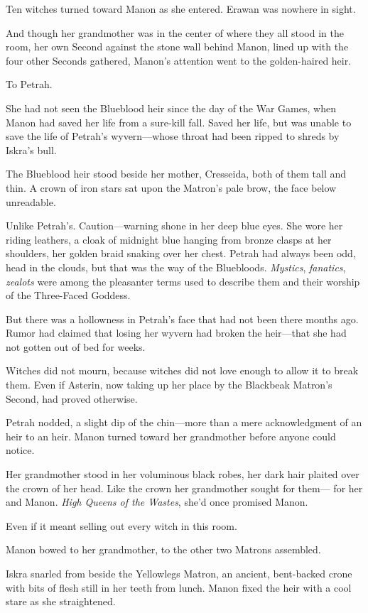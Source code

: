 Ten witches turned toward Manon as she entered. Erawan was nowhere in sight.

And though her grandmother was in the center of where they all stood in the room, her own Second against the stone wall behind Manon, lined up with the four other Seconds gathered, Manon's attention went to the golden-haired heir.

To Petrah.

She had not seen the Blueblood heir since the day of the War Games, when Manon had saved her life from a sure-kill fall. Saved her life, but was unable to save the life of Petrah's wyvern---whose throat had been ripped to shreds by Iskra's bull.

The Blueblood heir stood beside her mother, Cresseida, both of them tall and thin. A crown of iron stars sat upon the Matron's pale brow, the face below unreadable.

Unlike Petrah's. Caution---warning shone in her deep blue eyes. She wore her riding leathers, a cloak of midnight blue hanging from bronze clasps at her shoulders, her golden braid snaking over her chest. Petrah had always been odd, head in the clouds, but that was the way of the Bluebloods. \emph{Mystics}, \emph{fanatics}, \emph{zealots} were among the pleasanter terms used to describe them and their worship of the Three-Faced Goddess.

But there was a hollowness in Petrah's face that had not been there months ago. Rumor had claimed that losing her wyvern had broken the heir---that she had not gotten out of bed for weeks.

Witches did not mourn, because witches did not love enough to allow it to break them. Even if Asterin, now taking up her place by the Blackbeak Matron's Second, had proved otherwise.

Petrah nodded, a slight dip of the chin---more than a mere acknowledgment of an heir to an heir. Manon turned toward her grandmother before anyone could notice.

Her grandmother stood in her voluminous black robes, her dark hair plaited over the crown of her head. Like the crown her grandmother sought for them--- for her and Manon. \emph{High Queens of the Wastes}, she'd once promised Manon.

Even if it meant selling out every witch in this room.

Manon bowed to her grandmother, to the other two Matrons assembled.

Iskra snarled from beside the Yellowlegs Matron, an ancient, bent-backed crone with bits of flesh still in her teeth from lunch. Manon fixed the heir with a cool stare as she straightened.

